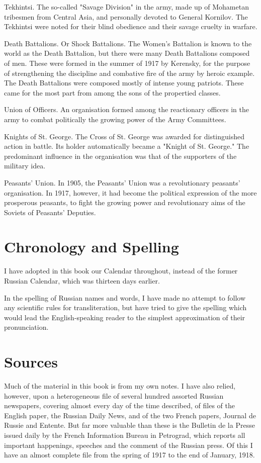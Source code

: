 \begin{enumerate}
Tekhintsi. The so-called "Savage Division" in the army, made up of Mohametan tribesmen from Central Asia, and personally devoted to General Kornilov. The Tekhintsi were noted for their blind obedience and their savage cruelty in warfare.

Death Battalions. Or Shock Battalions. The Women's Battalion is known to the world as the Death Battalion, but there were many Death Battalions composed of men. These were formed in the summer of 1917 by Kerensky, for the purpose of strengthening the discipline and combative fire of the army by heroic example. The Death Battalions were composed mostly of intense young patriots. These came for the most part from among the sons of the propertied classes.

Union of Officers. An organisation formed among the reactionary officers in the army to combat politically the growing power of the Army Committees.

Knights of St. George. The Cross of St. George was awarded for distinguished action in battle. Its holder automatically became a "Knight of St. George." The predominant influence in the organisation was that of the supporters of the military idea.

Peasants' Union. In 1905, the Peasants' Union was a revolutionary peasants' organisation. In 1917, however, it had become the political expression of the more prosperous peasants, to fight the growing power and revolutionary aims of the Soviets of Peasants' Deputies.

\section*{Chronology and Spelling}

I have adopted in this book our Calendar throughout, instead of the former Russian Calendar, which was thirteen days earlier.

In the spelling of Russian names and words, I have made no attempt to follow any scientific rules for transliteration, but have tried to give the spelling which would lead the English-speaking reader to the simplest approximation of their pronunciation.

\section*{Sources}

Much of the material in this book is from my own notes. I have also relied, however, upon a heterogeneous file of several hundred assorted Russian newspapers, covering almost every day of the time described, of files of the English paper, the Russian Daily News, and of the two French papers, Journal de Russie and Entente. But far more valuable than these is the Bulletin de la Presse issued daily by the French Information Bureau in Petrograd, which reports all important happenings, speeches and the comment of the Russian press. Of this I have an almost complete file from the spring of 1917 to the end of January, 1918.


\end{enumerate}
